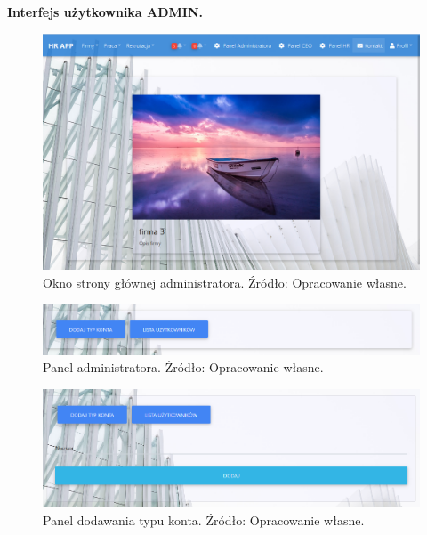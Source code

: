 \documentclass[twoside]{projektInzynierskiMS}
\numberwithin{figure}{section}
\begin{document}
\textbf{Interfejs użytkownika ADMIN.}

\begin{figure}[h!]
    \centering
    \includegraphics[width = \textwidth]{images/stronaGłównaAdmin.png}
    \caption{Okno strony głównej administratora. Źródło: Opracowanie własne.}
    \label{fig:strona_główna_admin}
\end{figure}

\newpage

\begin{figure}[h!]
    \centering
    \includegraphics[width = \textwidth]{images/panelAdmin.png}
    \caption{Panel administratora. Źródło: Opracowanie własne.}
    \label{fig:panel_administratora}
\end{figure}

\begin{figure}[h!]
    \centering
    \includegraphics[width = \textwidth]{images/dodawanieTypuKonta.png}
    \caption{Panel dodawania typu konta. Źródło: Opracowanie własne.}
    \label{fig:dodawanie_typu_konta}
\end{figure}
\end{document}
